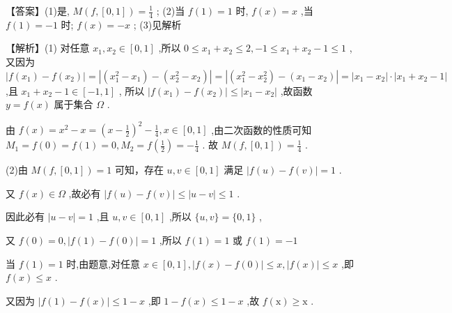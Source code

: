 \documentclass[10pt]{article}
\begin{document}
【答案】(1)是, \(M\left( {f,\left\lbrack  {0,1}\right\rbrack  }\right)  = \frac{1}{4}\) ; (2)当 \(f\left( 1\right)  = 1\) 时, \(f\left( x\right)  = x\) ,当 \(f\left( 1\right)  =  - 1\) 时; \(f\left( x\right)  =  - x\) ; (3)见解析

【解析】(1) 对任意 \({x}_{1},{x}_{2} \in  \left\lbrack  {0,1}\right\rbrack\) ,所以 \(0 \leq  {x}_{1} + {x}_{2} \leq  2, - 1 \leq  {x}_{1} + {x}_{2} - 1 \leq  1\) , 又因为 \(\left| {f\left( {x}_{1}\right)  - f\left( {x}_{2}\right) }\right|  = \left| {\left( {{x}_{1}^{2} - {x}_{1}}\right)  - \left( {{x}_{2}^{2} - {x}_{2}}\right) }\right|  = \left| {\left( {{x}_{1}^{2} - {x}_{2}^{2}}\right)  - \left( {{x}_{1} - {x}_{2}}\right) }\right|  = \left| {{x}_{1} - {x}_{2}}\right|  \cdot  \left| {{x}_{1} + {x}_{2} - 1}\right|\) ,且 \({x}_{1} + {x}_{2} - 1 \in  \left\lbrack  {-1,1}\right\rbrack\) , 所以 \(\left| {f\left( {x}_{1}\right)  - f\left( {x}_{2}\right) }\right|  \leq  \left| {{x}_{1} - {x}_{2}}\right|\) ,故函数 \(y = f\left( x\right)\) 属于集合 \(\Omega\) .

由 \(f\left( x\right)  = {x}^{2} - x = {\left( x - \frac{1}{2}\right) }^{2} - \frac{1}{4},x \in  \left\lbrack  {0,1}\right\rbrack\) ,由二次函数的性质可知 \({M}_{1} = f\left( 0\right)  = f\left( 1\right)  = 0,{M}_{2} = f\left( \frac{1}{2}\right)  =  - \frac{1}{4}\) . 故 \(M\left( {f,\left\lbrack  {0,1}\right\rbrack  }\right)  = \frac{1}{4}\) .

(2)由 \(M\left( {f,\left\lbrack  {0,1}\right\rbrack  }\right)  = 1\) 可知，存在 \(u,v \in  \left\lbrack  {0,1}\right\rbrack\) 满足 \(\left| {f\left( u\right)  - f\left( v\right) }\right|  = 1\) .

又 \(f\left( x\right)  \in  \Omega\) ,故必有 \(\left| {f\left( u\right)  - f\left( v\right) }\right|  \leq  \left| {u - v}\right|  \leq  1\) .

因此必有 \(\left| {u - v}\right|  = 1\) ,且 \(u,v \in  \left\lbrack  {0,1}\right\rbrack\) ,所以 \(\{ u,v\}  = \{ 0,1\}\) ,

又 \(f\left( 0\right)  = 0,\left| {f\left( 1\right)  - f\left( 0\right) }\right|  = 1\) ,所以 \(f\left( 1\right)  = 1\) 或 \(f\left( 1\right)  =  - 1\)

当 \(f\left( 1\right)  = 1\) 时,由题意,对任意 \(x \in  \left\lbrack  {0,1}\right\rbrack  ,\left| {f\left( x\right)  - f\left( 0\right) }\right|  \leq  x,\left| {f\left( x\right) }\right|  \leq  x\) ,即 \(f\left( x\right)  \leq  x\) .

又因为 \(\left| {f\left( 1\right)  - f\left( x\right) }\right|  \leq  1 - x\) ,即 \(1 - f\left( x\right)  \leq  1 - x\) ,故 \(f\left( \mathrm{x}\right)  \geq  \mathrm{x}\) .
\end{document}
